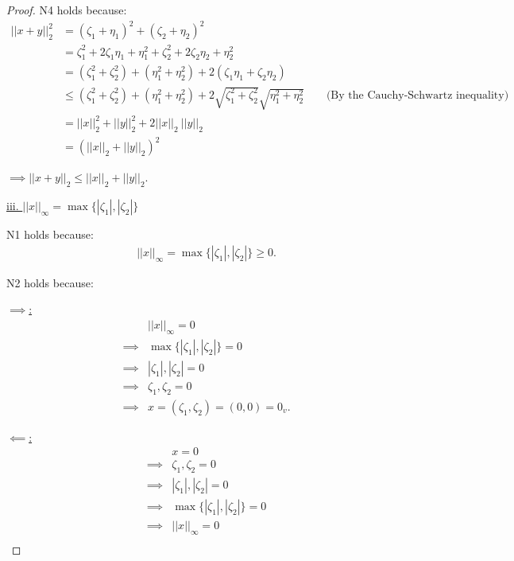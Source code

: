 \documentclass{article}
\begin{document}
\begin{proof}
  N4 holds because:
  \begin{align*}
    ||x+y||_2^2
    &= (\zeta_1 + \eta_1)^2 + (\zeta_2 + \eta_2)^2 \\
    &= \zeta_1^2 + 2\zeta_1 \eta_1 + \eta_1^2
    + \zeta_2^2 + 2\zeta_2 \eta_2 + \eta_2^2 \\
    &= (\zeta_1^2 + \zeta_2^2) 
    + (\eta_1^2 + \eta_2^2)
    + 2(\zeta_1 \eta_1 + \zeta_2 \eta_2) \\
    &\leq (\zeta_1^2 + \zeta_2^2) 
    + (\eta_1^2 + \eta_2^2)
    + 2\sqrt{\zeta_1^2 + \zeta_2^2} \sqrt{\eta_1^2 + \eta_2^2} \qquad \text{(By the Cauchy-Schwartz inequality)} \\
    &= ||x||_2^2 + ||y||_2^2 +  2||x||_2 \: ||y||_2 \\
    &= (||x||_2 + ||y||_2)^2
  \end{align*}

  \noindent
  $\implies ||x+y||_2 \leq ||x||_2 + ||y||_2$.
  \newline

  \underline{iii. $||x||_\infty = \max \lbrace |\zeta_1|, |\zeta_2| \rbrace$}
  \newline
  
  N1 holds because:
  \begin{align*}
    ||x||_\infty = \max \lbrace |\zeta_1|, |\zeta_2| \rbrace \geq 0.
  \end{align*}

  N2 holds because:

  \underline{$\implies$:}
  \begin{align*}
    & ||x||_\infty = 0 \\
    \implies& \max \lbrace |\zeta_1|, |\zeta_2| \rbrace = 0 \\
    \implies& |\zeta_1|, |\zeta_2| = 0 \\
    \implies& \zeta_1, \zeta_2 = 0 \\
    \implies& x = (\zeta_1, \zeta_2) = (0, 0) = 0_v.
  \end{align*}

  \underline{$\impliedby$:}
  \begin{align*}
    & x = 0 \\
    \implies& \zeta_1, \zeta_2 = 0 \\
    \implies& |\zeta_1|, |\zeta_2| = 0 \\
    \implies& \max \lbrace |\zeta_1|, |\zeta_2| \rbrace = 0 \\
    \implies& ||x||_\infty = 0 \\
  \end{align*}


\end{proof}
\end{document}
